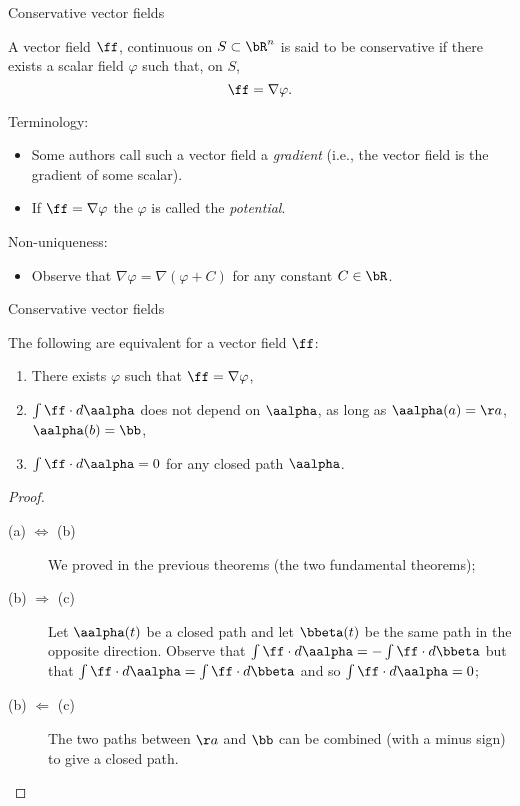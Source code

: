     {Conservative vector fields}

    \begin{definition}
        A vector field \(\ff\), continuous on \(S \subset \bR^n\) is said to be conservative if there exists a scalar field \(\varphi\) such that, on \(S\), \[\ff = \nabla \varphi.\]
    \end{definition}

    {Terminology:}

    \begin{itemize}
        \item     Some authors call such a vector field a \emph{gradient} (i.e., the vector field is the gradient of some scalar).
        \item If \(\ff = \nabla \varphi\) the \(\varphi\) is called the \emph{potential}.
    \end{itemize}

    {Non-uniqueness:}
    \begin{itemize}
        \item     Observe that \(\nabla \varphi = \nabla(\varphi + C)\) for any constant \(C \in \bR\).
    \end{itemize}






    {Conservative vector fields}

    \begin{theorem}
        The following are equivalent for a vector field \(\ff\):
        \begin{enumerate}
            \item There exists \(\varphi\) such that \(\ff = \nabla \varphi\),
            \item \(\int \ff \cdot d\aalpha\) does not depend on \(\aalpha\), as long as \(\aalpha(a)=\aa\), \(\aalpha(b)=\bb\),
            \item \(\int \ff \cdot d\aalpha = 0\) for any closed path \(\aalpha\).
        \end{enumerate}
    \end{theorem}

    \begin{proof}
        \begin{description}
            \item[(a) \(\Leftrightarrow\) (b)] We proved in the previous theorems (the two fundamental theorems);
            \item[(b) \(\Rightarrow\) (c)] Let \(\aalpha(t)\) be a closed path and let \(\bbeta(t)\) be the same path in the opposite direction. Observe that \(\int \ff \cdot d\aalpha = - \int \ff \cdot d \bbeta\) but that \(\int \ff \cdot d \aalpha = \int \ff \cdot d \bbeta\) and so \(\int \ff \cdot d \aalpha = 0\);
            \item[(b) \(\Leftarrow\) (c)] The two paths between \(\aa\) and \(\bb\) can be combined (with a minus sign) to give a closed path.
        \end{description}
    \end{proof}






